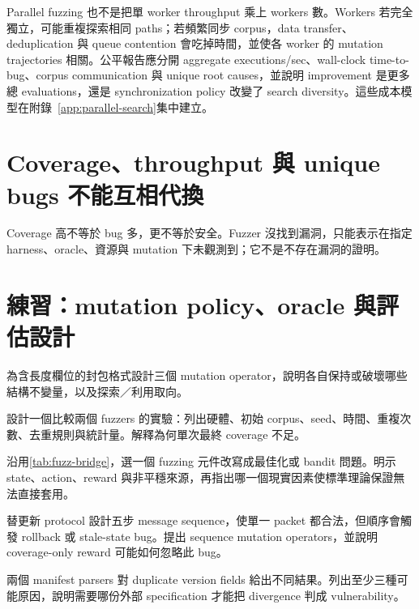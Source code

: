 \documentclass[11pt,a4paper,oneside,openany]{book}
\begin{document}
Parallel fuzzing 也不是把單 worker throughput 乘上 workers 數。Workers 若完全獨立，可能重複探索相同 paths；若頻繁同步 corpus，data transfer、deduplication 與 queue contention 會吃掉時間，並使各 worker 的 mutation trajectories 相關。公平報告應分開 aggregate executions/sec、wall-clock time-to-bug、corpus communication 與 unique root causes，並說明 improvement 是更多總 evaluations，還是 synchronization policy 改變了 search diversity。這些成本模型在附錄~\ref{app:parallel-search}集中建立。

\section{Coverage、throughput 與 unique bugs 不能互相代換}
\begin{misconception}
Coverage 高不等於 bug 多，更不等於安全。Fuzzer 沒找到漏洞，只能表示在指定 harness、oracle、資源與 mutation 下未觀測到；它不是不存在漏洞的證明。
\end{misconception}

\section{練習：mutation policy、oracle 與評估設計}
\begin{exercise}
為含長度欄位的封包格式設計三個 mutation operator，說明各自保持或破壞哪些結構不變量，以及探索／利用取向。
\end{exercise}
\begin{exercise}
設計一個比較兩個 fuzzers 的實驗：列出硬體、初始 corpus、seed、時間、重複次數、去重規則與統計量。解釋為何單次最終 coverage 不足。
\end{exercise}
\begin{exercise}
沿用\cref{tab:fuzz-bridge}，選一個 fuzzing 元件改寫成最佳化或 bandit 問題。明示 state、action、reward 與非平穩來源，再指出哪一個現實因素使標準理論保證無法直接套用。
\end{exercise}
\begin{exercise}
替更新 protocol 設計五步 message sequence，使單一 packet 都合法，但順序會觸發 rollback 或 stale-state bug。提出 sequence mutation operators，並說明 coverage-only reward 可能如何忽略此 bug。
\end{exercise}
\begin{exercise}
兩個 manifest parsers 對 duplicate version fields 給出不同結果。列出至少三種可能原因，說明需要哪份外部 specification 才能把 divergence 判成 vulnerability。
\end{exercise}
\end{document}

